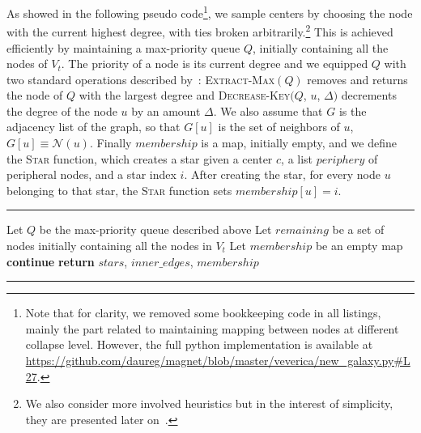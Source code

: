 As showed in the following pseudo code\footnote{Note that for
clarity, we removed some bookkeeping code in all listings, mainly the part related to maintaining
mapping between nodes at different collapse level. However, the full python implementation
is available at \url{https://github.com/daureg/magnet/blob/master/veverica/new_galaxy.py\#L27}.}, we
sample centers by choosing the node with the current highest degree, with ties broken
arbitrarily.\footnote{We also consider more involved heuristics but in the interest of simplicity,
they are presented later on~.} This is achieved efficiently by
maintaining a max-priority queue $Q$, initially containing all the nodes of $V_t$. The priority of a
node is its current degree and we equipped $Q$ with two standard operations described
by~\textcite[section 6.5]{CormenAlgo09}: \textsc{Extract-Max}$(Q)$ removes and returns the
node of $Q$ with the largest degree and \textsc{Decrease-Key}$(Q$, $u$, $\Delta)$ decrements
the degree of the node $u$ by an amount $\Delta$.
We also assume that $G$ is the adjacency list of the graph, so that $G[u]$ is the set of neighbors of
$u$, \ie{} $G[u] \equiv \mathcal{N}(u)$. Finally $membership$ is a map, initially empty, and we
define the \textsc{Star} function, which creates a star given a center $c$, a list $periphery$ of
peripheral nodes, and a star index $i$. After creating the \ith{} star, for every node $u$ belonging
to that star, the \textsc{Star} function sets $membership[u] = i$.
\vspace{-\baselineskip}

\begin{center}
  \rule{\textwidth}{.3pt}
  \begin{algorithmic}[1]
      \State Let $Q$ be the max-priority queue described above
      \State Let $remaining$ be a set of nodes initially containing all the nodes in $V_t$
      \State Let $membership$ be an empty map
          \State \textbf{continue} 
        \EndIf
            \State {}
          \EndFor
        \EndFor
      \EndWhile
      \State \textbf{return} $stars$, $inner\_edges$, $membership$
    \EndFunction
  \end{algorithmic}
  \rule{\textwidth}{.3pt}
\end{center}

